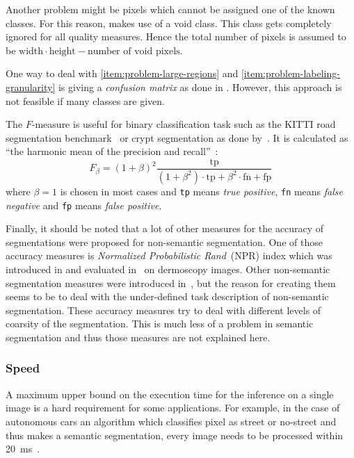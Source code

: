 Another problem might be pixels which cannot be assigned one of the known
classes. For this reason, \cite{shotton2006textonboost} makes use of a void
class. This class gets completely ignored for all quality measures. Hence the
total number of pixels is assumed to be $\text{width} \cdot \text{height} - \text{number of void pixels}$.

One way to deal with \cref{item:problem-large-regions} and
\cref{item:problem-labeling-granularity} is giving a \textit{confusion matrix}
as done in \cite{shotton2006textonboost}. However, this approach is not
feasible if many classes are given.

The $F$-measure is useful for binary classification task such as the KITTI road
segmentation benchmark~\cite{Fritsch2013ITSC} or crypt segmentation as done
by~\cite{cohen2015memory}. It is calculated as \enquote{the harmonic mean of
the precision and recall}~\cite{pantofaru2005comparison}:
\[F_\beta = (1+\beta)^2 \frac{\text{tp}}{(1+\beta^2)\cdot \text{tp}+ \beta^2 \cdot \text{fn} + \text{fp}}\]
where $\beta=1$ is chosen in most cases and \texttt{tp} means \textit{true
positive}, \texttt{fn} means \textit{false negative} and  \texttt{fp} means
\textit{false positive}.

Finally, it should be noted that a lot of other measures for the accuracy of
segmentations were proposed for non-semantic segmentation. One of those
accuracy measures is \textit{Normalized Probabilistic Rand}~(NPR) index which
was introduced in \cite{unnikrishnan2005measure} and evaluated
in~\cite{celebi2009improved} on dermoscopy images. Other non-semantic
segmentation measures were introduced in~\cite{martin2001database}, but the
reason for creating them seems to be to deal with the under-defined task
description of non-semantic segmentation. These accuracy measures try to deal
with different levels of coarsity of the segmentation. This is much less of a
problem in semantic segmentation and thus those measures are not explained
here.


\subsubsection{Speed}%
\label{subsubsec:speed-quality-measure}%
A maximum upper bound on the execution time for the inference on a single image
is a hard requirement for some applications. For example, in the case of
autonomous cars an algorithm which classifies pixel as street or no-street
and thus makes a semantic segmentation, every image needs to be processed
within \SI{20}{\milli\second}~\cite{bittel2015pixel}.

